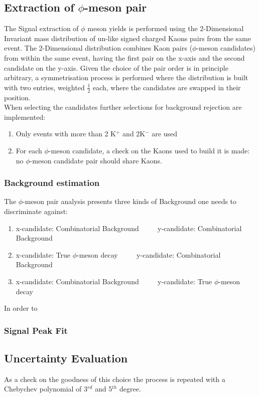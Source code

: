 \subsection{Extraction of $\phi$-meson pair}
The Signal extraction of $\phi$ meson yields is performed using the 2-Dimensional Invariant mass distribution of un-like signed charged Kaons pairs from the same event. The 2-Dimensional distribution combines Kaon pairs ($\phi$-meson candidates) from within the same event, having the first pair on the x-axis and the second candidate on the y-axis. Given the choice of the pair order is in principle arbitrary, a symmetrisation process is performed where the distribution is built with two entries, weighted $\frac{1}{2}$ each, where the candidates are swapped in their position.\\
\indent When selecting the candidates further selections for background rejection are implemented:
\begin{enumerate}
\item Only events with more than 2 K$^{+}$ and 2K$^{-}$ are used
\item For each $\phi$-meson candidate, a check on the Kaons used to build it is made: no $\phi$-meson candidate pair should share Kaons.
\end{enumerate}
\subsubsection{Background estimation}
The $\phi$-meson pair analysis presents three kinds of Background one needs to discriminate against:
\begin{enumerate}
\item x-candidate: Combinatorial Background	$\qquad$ 		y-candidate: Combinatorial Background
\item x-candidate: True $\phi$-meson decay	$\qquad$ 		y-candidate: Combinatorial Background
\item x-candidate: Combinatorial Background	$\qquad$ 		y-candidate: True $\phi$-meson decay
\end{enumerate}
In order to 
\subsubsection{Signal Peak Fit}

\subsection{Uncertainty Evaluation}
As a check on the goodness of this choice the process is repeated with a Chebychev polynomial of 3$^{rd}$ and 5$^{th}$ degree.


\begin{comment}
\end{comment}